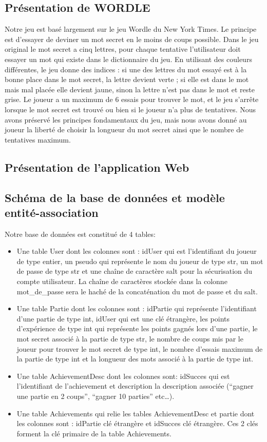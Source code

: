 \subsection{Présentation de WORDLE}
\tabto{1cm}Notre jeu est basé largement sur le jeu Wordle du New York Times. Le principe est d’essayer de deviner un mot secret en le moins de coups possible. Dans le jeu original le mot secret a cinq lettres, pour chaque tentative l’utilisateur doit essayer un mot qui existe dans le dictionnaire du jeu. En utilisant des couleurs différentes, le jeu donne des indices : si une des lettres du mot essayé est à la bonne place dans le mot secret, la lettre devient verte ; si elle est dans le mot mais mal placée elle devient jaune, sinon la lettre n’est pas dans le mot et reste grise. Le joueur a un maximum de 6 essais pour trouver le mot, et le jeu s’arrête lorsque le mot secret est trouvé ou bien si le joueur n’a plus de tentatives. Nous avons préservé les principes fondamentaux du jeu, mais nous avons donné au joueur la liberté de choisir la longueur du mot secret ainsi que le nombre de tentatives maximum.

\subsection{Présentation de l'application Web}
\subsection{Schéma de la base de données et modèle entité-association}
Notre base de données est constitué de 4 tables:
\begin{itemize}
    \item Une table User dont les colonnes sont : idUser qui est l’identifiant du joueur de type entier, un pseudo qui représente le nom du joueur de type str, un mot de passe de type str et une chaîne de caractère salt pour la sécurisation du compte utilisateur. La chaîne de caractères stockée dans la colonne mot\_de\_passe sera le haché de la concaténation du mot de passe et du salt.
    \item Une table Partie dont les colonnes sont : idPartie qui représente l’identifiant d’une partie de type int, idUser qui est une clé étrangère, les points d'expérience de type int qui représente les points gagnés lors d’une partie, le mot secret associé à la partie de type str, le nombre de coups mis par le joueur pour trouver le mot secret de type int, le nombre d’essais maximum de la partie de type int et la longueur des mots associé à la partie de type int.
    \item Une table AchievementDesc dont les colonnes sont: idSucces qui est l’identifiant de l’achievement et description la description associée (“gagner une partie en 2 coups”, “gagner 10 parties” etc\dots{}).
    \item Une table Achievements qui relie les tables AchievementDesc et partie dont les colonnes sont : idPartie clé étrangère et idSucces clé étrangère. Ces 2 clés forment la clé primaire de la table Achievements.
\end{itemize}


